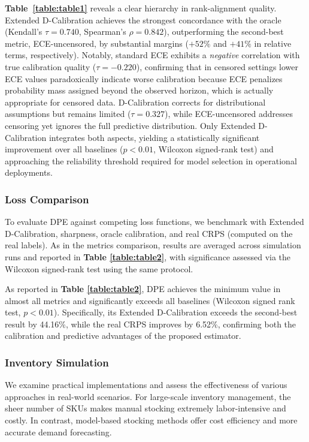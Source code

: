 \documentclass[sigconf]{acmart}
\begin{document}


\textbf{Table~\ref{table:table1}} reveals a clear hierarchy in rank-alignment quality. Extended D-Calibration achieves the strongest concordance with the oracle (Kendall's $\tau = 0.740$, Spearman's $\rho = 0.842$), outperforming the second-best metric, ECE-uncensored, by substantial margins ($+52\%$ and $+41\%$ in relative terms, respectively). Notably, standard ECE exhibits a \emph{negative} correlation with true calibration quality ($\tau = -0.220$), confirming that in censored settings lower ECE values paradoxically indicate worse calibration because ECE penalizes probability mass assigned beyond the observed horizon, which is actually appropriate for censored data. D-Calibration corrects for distributional assumptions but remains limited ($\tau = 0.327$), while ECE-uncensored addresses censoring yet ignores the full predictive distribution. Only Extended D-Calibration integrates both aspects, yielding a statistically significant improvement over all baselines ($p < 0.01$, Wilcoxon signed-rank test) and approaching the reliability threshold required for model selection in operational deployments.


\subsubsection{Loss Comparison}
To evaluate DPE against competing loss functions, we benchmark with Extended D-Calibration, sharpness, oracle calibration, and real CRPS (computed on the real labels). As in the metrics comparison, results are averaged across simulation runs and reported in \textbf{Table \ref{table:table2}}, with significance assessed via the Wilcoxon signed-rank test using the same protocol.





As reported in \textbf{Table \ref{table:table2}}, DPE achieves the minimum value in almost all metrics and significantly exceeds all baselines (Wilcoxon signed rank test, $p < 0.01$). Specifically, its Extended D-Calibration exceeds the second-best result by 44.16\%, while the real CRPS improves by 6.52\%, confirming both the calibration and predictive advantages of the proposed estimator.


\subsubsection{Inventory Simulation}
 We examine practical implementations and assess the effectiveness of various approaches in real-world scenarios. For large-scale inventory management, the sheer number of SKUs makes manual stocking extremely labor-intensive and costly. In contrast, model-based stocking methods offer cost efficiency and more accurate demand forecasting.
\end{document}
